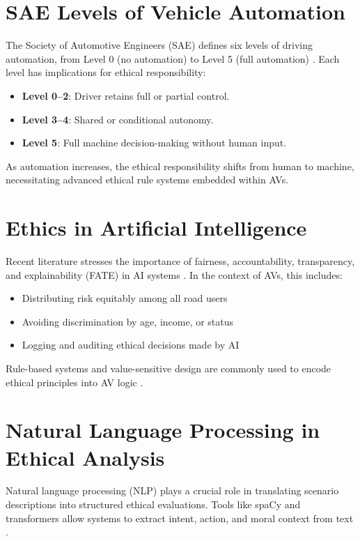 \section{SAE Levels of Vehicle Automation}

The Society of Automotive Engineers (SAE) defines six levels of driving automation, from Level 0 (no automation) to Level 5 (full automation) \cite{sae2018j3016}. Each level has implications for ethical responsibility:

\begin{itemize}
    \item \textbf{Level 0--2}: Driver retains full or partial control.
    \item \textbf{Level 3--4}: Shared or conditional autonomy.
    \item \textbf{Level 5}: Full machine decision-making without human input.
\end{itemize}

As automation increases, the ethical responsibility shifts from human to machine, necessitating advanced ethical rule systems embedded within AVs.

\section{Ethics in Artificial Intelligence}

Recent literature stresses the importance of fairness, accountability, transparency, and explainability (FATE) in AI systems \cite{jobin2019global}. In the context of AVs, this includes:

\begin{itemize}
    \item Distributing risk equitably among all road users
    \item Avoiding discrimination by age, income, or status
    \item Logging and auditing ethical decisions made by AI
\end{itemize}

Rule-based systems and value-sensitive design are commonly used to encode ethical principles into AV logic \cite{binns2018fairness}.

\section{Natural Language Processing in Ethical Analysis}

Natural language processing (NLP) plays a crucial role in translating scenario descriptions into structured ethical evaluations. Tools like spaCy and transformers allow systems to extract intent, action, and moral context from text \cite{jurafsky2023speech}.

